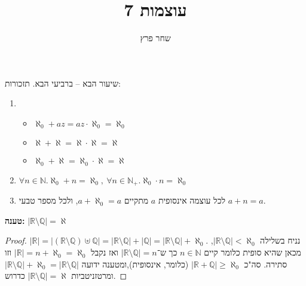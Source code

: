 \documentclass[]{article}
\title{עוצמות 7}
\author{שחר פרץ}
\newcommand\N     {\mathbb{N}}
\newcommand\R     {\mathbb{R}}
\newcommand\Q     {\mathbb{Q}}
\newcommand\az    {\aleph_0}
\newcommand\al    {\aleph}
\begin{document}
	\maketitle
	שיעור הבא – ברביעי הבא. תזכורות: 
	\begin{enumerate}
		\item \begin{itemize}
			\item $ \az + az = az \cdot\az = \az $
			\item $ \al + \al = \al \cdot \al = \al $
			\item $ \az + \al= \az \cdot \al = \al $
		\end{itemize}
		\item $ \forall n \in \N. \az + n = \az, \ \forall n \in \N_+. \az \cdot n = \az $ 
		\item לכל עוצמה אינסופית $ a $ מתקיים $ a + \az = a $, ולכל מספר טבעי $ a + n = a $. 
	\end{enumerate}
	\textbf{טענה: }$ | \R \setminus \Q | = \al  $
	\begin{proof}
		$ |\R| = |(\R \setminus \Q) \uplus \Q| = |\R \setminus \Q| + |\Q| = |\R \setminus \Q| + \az $. נניח בשלילה $ |\R \setminus \Q| < \az $, מכאן שהיא סופית כלומר קיים $ n \in \N $ כך ש־$ |\R \setminus \Q| = n $ ואז נקבל $ |\R| = n + \az = \az $ וזו סתירה. סה"כ $ |\R + \Q| \ge \az $ (כלומר, אינסופית),ומטענה ידועה $ |\R \setminus \Q| + \az = |\R \setminus \Q| $ ומרטזניטביות $ |\R\setminus\Q| = \al $ כדרוש. 
	\end{proof}
\end{document}
